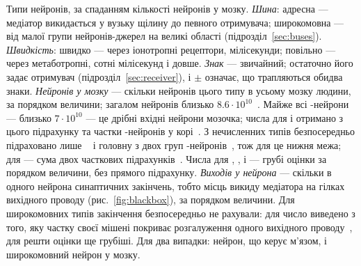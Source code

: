 \begin{table}[t]
\caption{Типи нейронів, за спаданням кількості нейронів у мозку. \emph{Шина}: адресна --- медіатор викидається у вузьку щілину до певного отримувача; широкомовна --- від малої групи нейронів-джерел на великі області (підрозділ~\ref{sec:buses}). \emph{Швидкість}: швидко --- через іонотропні рецептори, мілісекунди; повільно --- через метаботропні, сотні мілісекунд і довше. \emph{Знак} --- звичайний; остаточно його задає отримувач (підрозділ~\ref{sec:receiver}), і $\pm$ означає, що трапляються обидва знаки. \emph{Нейронів у мозку} --- скільки нейронів цього типу в усьому мозку людини, за порядком величини; загалом нейронів близько $8.6\cdot10^{10}$~\cite{Azevedo2009}. Майже всі -нейрони --- близько $7\cdot10^{10}$ --- це дрібні вхідні нейрони мозочка; числа для  і  отримано з цього підрахунку та частки -нейронів у корі~\cite{Hendry1987}. З нечисленних типів безпосередньо підраховано лише ~\cite{Airaksinen1991} і головну з двох груп -нейронів~\cite{Pakkenberg1991}, тож для  це нижня межа; для  --- сума двох часткових підрахунків~\cite{Baker1990,Baker1991}. Числа для , ,  і  --- грубі оцінки за порядком величини, без прямого підрахунку. \emph{Виходів у нейрона} --- скільки в одного нейрона синаптичних закінчень, тобто місць викиду медіатора на гілках вихідного проводу (рис.~\ref{fig:blackbox}), за порядком величини. Для широкомовних типів закінчення безпосередньо не рахували: для  число виведено з того, яку частку своєї мішені покриває розгалуження одного вихідного проводу~\cite{Matsuda2009}, для решти оцінки ще грубіші. Для  два випадки: нейрон, що керує м'язом, і широкомовний нейрон у мозку.}
\label{tab:types}
\end{table}

